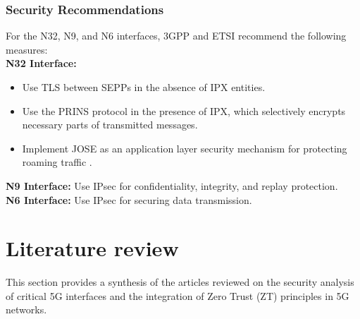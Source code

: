 \documentclass{report}
\begin{document}
\subsubsection{Security Recommendations}
    For the N32, N9, and N6 interfaces, 3GPP and ETSI recommend the following measures:\\
    
    \noindent\textbf{N32 Interface: }
    \begin{itemize}
        \item Use TLS between SEPPs in the absence of IPX entities.
        \item Use the PRINS protocol in the presence of IPX, which selectively encrypts necessary parts of transmitted messages.
        \item Implement JOSE as an application layer security mechanism for protecting roaming traffic \cite{mahyoub2024security}.
    \end{itemize}
    
    \noindent\textbf{N9 Interface:} Use IPsec for confidentiality, integrity, and replay protection.\\
    
    \noindent\textbf{N6 Interface:} Use IPsec for securing data transmission.
    
\section{Literature review}
This section provides a synthesis of the articles reviewed on the security analysis of critical 5G interfaces and the integration of Zero Trust (ZT) principles in 5G networks.
\end{document}

